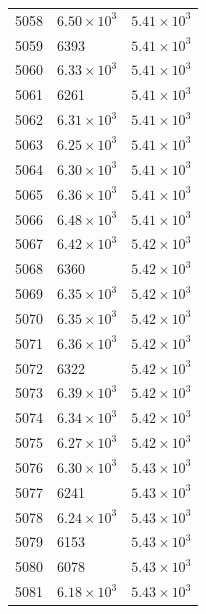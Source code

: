 \begin{table}[H]
\begin{tabular}{lll}
5058 & $\displaystyle 6.50 \times 10^{3}$ & $\displaystyle 5.41 \times 10^{3}$ \\
5059 & 6393 & $\displaystyle 5.41 \times 10^{3}$ \\
5060 & $\displaystyle 6.33 \times 10^{3}$ & $\displaystyle 5.41 \times 10^{3}$ \\
5061 & 6261 & $\displaystyle 5.41 \times 10^{3}$ \\
5062 & $\displaystyle 6.31 \times 10^{3}$ & $\displaystyle 5.41 \times 10^{3}$ \\
5063 & $\displaystyle 6.25 \times 10^{3}$ & $\displaystyle 5.41 \times 10^{3}$ \\
5064 & $\displaystyle 6.30 \times 10^{3}$ & $\displaystyle 5.41 \times 10^{3}$ \\
5065 & $\displaystyle 6.36 \times 10^{3}$ & $\displaystyle 5.41 \times 10^{3}$ \\
5066 & $\displaystyle 6.48 \times 10^{3}$ & $\displaystyle 5.41 \times 10^{3}$ \\
5067 & $\displaystyle 6.42 \times 10^{3}$ & $\displaystyle 5.42 \times 10^{3}$ \\
5068 & 6360 & $\displaystyle 5.42 \times 10^{3}$ \\
5069 & $\displaystyle 6.35 \times 10^{3}$ & $\displaystyle 5.42 \times 10^{3}$ \\
5070 & $\displaystyle 6.35 \times 10^{3}$ & $\displaystyle 5.42 \times 10^{3}$ \\
5071 & $\displaystyle 6.36 \times 10^{3}$ & $\displaystyle 5.42 \times 10^{3}$ \\
5072 & 6322 & $\displaystyle 5.42 \times 10^{3}$ \\
5073 & $\displaystyle 6.39 \times 10^{3}$ & $\displaystyle 5.42 \times 10^{3}$ \\
5074 & $\displaystyle 6.34 \times 10^{3}$ & $\displaystyle 5.42 \times 10^{3}$ \\
5075 & $\displaystyle 6.27 \times 10^{3}$ & $\displaystyle 5.42 \times 10^{3}$ \\
5076 & $\displaystyle 6.30 \times 10^{3}$ & $\displaystyle 5.43 \times 10^{3}$ \\
5077 & 6241 & $\displaystyle 5.43 \times 10^{3}$ \\
5078 & $\displaystyle 6.24 \times 10^{3}$ & $\displaystyle 5.43 \times 10^{3}$ \\
5079 & 6153 & $\displaystyle 5.43 \times 10^{3}$ \\
5080 & 6078 & $\displaystyle 5.43 \times 10^{3}$ \\
5081 & $\displaystyle 6.18 \times 10^{3}$ & $\displaystyle 5.43 \times 10^{3}$ \\

\end{tabular}
\end{table}
